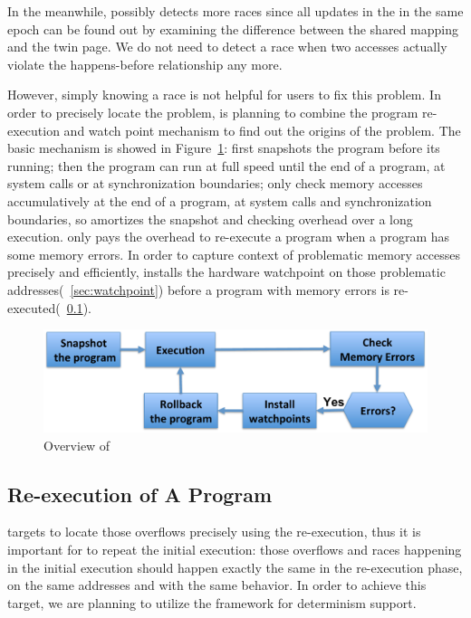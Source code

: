 In the meanwhile, \stopgap{} possibly detects more races since all updates in the 
in the same epoch can be found out by examining the difference between the shared 
mapping and the twin page.
We do not need to detect a race when two accesses actually violate the happens-before 
relationship any more.

However, simply knowing a race is not helpful for users to fix this problem. 
In order to precisely locate the problem, \stopgap{} is planning to combine the program
re-execution and watch point mechanism to find out the origins of the problem.
The basic mechanism is showed in Figure~\ref{fig:stopgapoverview}: 
\stopgap{} first snapshots the program before its running; then the program can run at 
full speed until the end of a program, at system calls or at synchronization boundaries;
\stopgap{} only check memory accesses accumulatively at the end of a program, at system calls and 
synchronization boundaries,  so \stopgap{} amortizes
the snapshot and checking overhead over a long execution.
\stopgap{} only pays the overhead to re-execute a program when a program has some memory errors. 
In order to capture context of problematic memory accesses precisely and efficiently,
\stopgap{} installs the hardware watchpoint on those problematic addresses(~\ref{sec:watchpoint})
before a program with memory errors is re-executed(~\ref{sec:re-execute}).

\begin{figure}[!t]
{\centering
\includegraphics[width=5.4in]{fig/stopgapoverview2}
\caption{Overview of \stopgap{}
\label{fig:stopgapoverview}}
}
\end{figure}

\subsection{Re-execution of A Program}
\label{sec:re-execute}
\stopgap{} targets to locate those overflows precisely using the re-execution,
thus it is important for \stopgap{} to repeat the initial execution:
those overflows and races happening in the initial execution should happen exactly the same in
the re-execution phase, on the same addresses and with the same behavior.
In order to achieve this target, 
we are planning to utilize the \dthreads{} framework for determinism support.  

